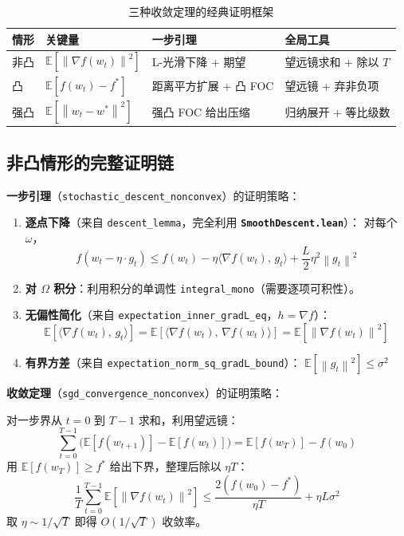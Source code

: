 \documentclass[12pt, a4paper]{article}
\newcommand{\E}{\mathbb{E}}
\newcommand{\gradF}{\nabla f}
\newcommand{\ip}[2]{\langle #1,\, #2 \rangle}
\newcommand{\norm}[1]{\left\| #1 \right\|}
\newcommand{\wstar}{w^*}
\newcommand{\lean}[1]{\texttt{#1}}
\newcommand{\file}[1]{\textbf{\texttt{#1}}}
\begin{document}
\begin{table}[H]
\centering
\caption{三种收敛定理的经典证明框架}
\begin{tabular}{p{2cm}p{3.5cm}p{4cm}p{3.5cm}}
\toprule
\textbf{情形} & \textbf{关键量} & \textbf{一步引理} & \textbf{全局工具} \\
\midrule
非凸 & $\E[\norm{\gradF(w_t)}^2]$ & L-光滑下降 + 期望 & 望远镜求和 + 除以 $T$ \\
凸 & $\E[f(w_t) - f^*]$ & 距离平方扩展 + 凸 FOC & 望远镜 + 弃非负项 \\
强凸 & $\E[\norm{w_t - \wstar}^2]$ & 强凸 FOC 给出压缩 & 归纳展开 + 等比级数 \\
\bottomrule
\end{tabular}
\end{table}

\subsection{非凸情形的完整证明链}

\textbf{一步引理}（\lean{stochastic\_descent\_nonconvex}）的证明策略：

\begin{enumerate}
  \item \textbf{逐点下降}（来自 \lean{descent\_lemma}，完全利用 \file{SmoothDescent.lean}）：
        对每个 $\omega$，
        \[
          f(w_t - \eta \cdot g_t) \leq f(w_t) - \eta \ip{\gradF(w_t)}{g_t} + \frac{L}{2}\eta^2\norm{g_t}^2
        \]

  \item \textbf{对 $\Omega$ 积分}：利用积分的单调性 \lean{integral\_mono}（需要逐项可积性）。

  \item \textbf{无偏性简化}（来自 \lean{expectation\_inner\_gradL\_eq}，$h = \gradF$）：
        \[
          \E[\ip{\gradF(w_t)}{g_t}] = \E[\ip{\gradF(w_t)}{\gradF(w_t)}] = \E[\norm{\gradF(w_t)}^2]
        \]

  \item \textbf{有界方差}（来自 \lean{expectation\_norm\_sq\_gradL\_bound}）：
        $\E[\norm{g_t}^2] \leq \sigma^2$
\end{enumerate}

\textbf{收敛定理}（\lean{sgd\_convergence\_nonconvex}）的证明策略：

对一步界从 $t=0$ 到 $T-1$ 求和，利用望远镜：
\[
  \sum_{t=0}^{T-1} \bigl(\E[f(w_{t+1})] - \E[f(w_t)]\bigr) = \E[f(w_T)] - f(w_0)
\]
用 $\E[f(w_T)] \geq f^*$ 给出下界，整理后除以 $\eta T$：
\[
  \frac{1}{T}\sum_{t=0}^{T-1}\E[\norm{\gradF(w_t)}^2]
  \leq \frac{2(f(w_0) - f^*)}{\eta T} + \eta L \sigma^2
\]
取 $\eta \sim 1/\sqrt{T}$ 即得 $O(1/\sqrt{T})$ 收敛率。
\end{document}
